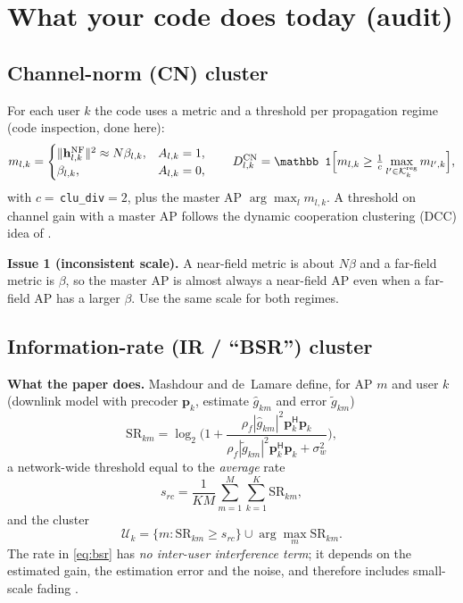 \documentclass[11pt]{article}
\begin{document}
\tableofcontents
\newpage

\section{What your code does today (audit)}
\label{sec:audit}

\subsection{Channel-norm (CN) cluster}
For each user $k$ the code uses a metric and a threshold per propagation regime (code inspection, done here):
\begin{equation}
  m_{l,k}=\begin{cases}\|\mathbf h^{\rm NF}_{l,k}\|^2\approx N\beta_{l,k}, & A_{l,k}=1,\\ \beta_{l,k}, & A_{l,k}=0,\end{cases}\qquad
  D^{\rm CN}_{l,k}=\mathbb 1\Big[m_{l,k}\ge \tfrac{1}{c}\max_{l'\in\mathcal K^{\rm reg}_k} m_{l',k}\Big],
\end{equation}
with $c=$\,\texttt{clu\_div}$=2$, plus the master AP $\arg\max_l m_{l,k}$. A threshold on channel gain with a master AP follows the dynamic cooperation clustering (DCC) idea of \cite{bjornson2020scalable}.

\textbf{Issue 1 (inconsistent scale).} A near-field metric is about $N\beta$ and a far-field metric is $\beta$, so the master AP is almost always a near-field AP even when a far-field AP has a larger $\beta$. Use the same scale for both regimes.

\subsection{Information-rate (IR / ``BSR'') cluster}
\textbf{What the paper does.} Mashdour and de~Lamare define, for AP $m$ and user $k$ (downlink model with precoder $\mathbf p_k$, estimate $\hat g_{km}$ and error $\tilde g_{km}$) \cite[eq.~(11)]{mashdour2024study}
\begin{equation}
  \mathrm{SR}_{km}=\log_2\!\Big(1+\frac{\rho_f|\hat g_{km}|^2\mathbf p_k^{\mathsf H}\mathbf p_k}{\rho_f|\tilde g_{km}|^2\mathbf p_k^{\mathsf H}\mathbf p_k+\sigma_w^2}\Big),
  \label{eq:bsr}
\end{equation}
a network-wide threshold equal to the \emph{average} rate \cite[eq.~(12)]{mashdour2024study}
\begin{equation}
  s_{rc}=\frac1{KM}\sum_{m=1}^M\sum_{k=1}^K\mathrm{SR}_{km},
\end{equation}
and the cluster \cite[eq.~(13), Algorithm~1]{mashdour2024study}
\begin{equation}
  \mathcal U_k=\{m:\mathrm{SR}_{km}\ge s_{rc}\}\cup\arg\max_m \mathrm{SR}_{km}.
\end{equation}
The rate in \eqref{eq:bsr} has \emph{no inter-user interference term}; it depends on the estimated gain, the estimation error and the noise, and therefore includes small-scale fading \cite[Sec.~III-B]{mashdour2024study}.
\end{document}
